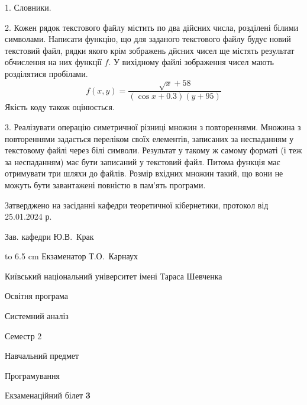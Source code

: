 \documentclass[12pt, ukrainian]{article}
\begin{document}
{%
1. Словники.%
\par
\vspace{2mm}

2. Кожен рядок текстового файлу містить по два дійсних числа, розділені білими символами.
Написати функцію, що для заданого текстового файлу будує новий текстовий файл, рядки якого крім зображень дйсних чисел ще містять результат обчислення на них функції $f$. У вихідному файлі зображення чисел мають розділятися пробілами. 
$$f(x, y) =\frac{\sqrt x + 58}{(\cos x + 0.3) (y + 95)}$$ 
Якість коду також оцінюється.

\par
\vspace{2mm}

3. Реалізувати операцію симетричної різниці множин з повтореннями. Множина з повтореннями задається переліком своїх елементів, записаних за неспаданням у текстовому файлі через білі символи. Результат у такому ж самому форматі (і теж за неспаданням) має бути записаний у текстовий файл. Питома функція має отримувати три шляхи до файлів. Розмір вхідних множин такий, що вони не можуть бути завантажені повністю в пам’ять програми.

}
{\smallskip\smallskip \begin {scriptsize} Затверджено на засіданні кафедри теоретичної кібернетики, протокол   від   25.01.2024 р.\par\smallskip\smallskip\smallskip\smallskip
{\parbox {6.5 cm} {Зав. кафедри \dotfill Ю.В.~Крак}}\hspace {0.7cm} {\hbox to 6.5 cm { Екзаменатор \dotfill Т.О.~Карнаух}} \end{scriptsize}}
\newpage
{{\begin {scriptsize}\par
{ \center  Київський національний університет імені Тараса Шевченка \par}
{\parbox {5 cm}{Освітня програма \hfill}{\parbox {7 cm}{Системний аналіз\hfill}}\parbox {6 cm}{\hfill Семестр 2}}\par
{\parbox {5 cm} {Навчальний предмет \hfill}\parbox {7 cm}{Програмування \hfill}\parbox {6cm}{\hfill}\par}\vspace{-15pt} \end{scriptsize}}{\center Екзаменаційний білет \No \textbf { 3 }\par}}
\end{document}
